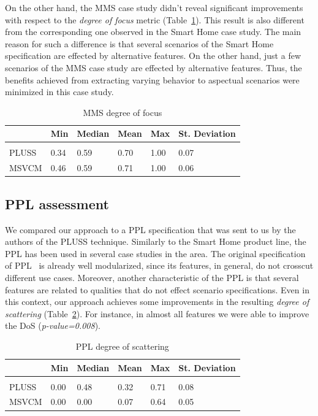 On the other hand, the MMS case study didn't reveal significant improvements with
respect to the \emph{degree of focus} metric (Table~\ref{tab:mms-dof}). This
result is also different from the corresponding one observed in the Smart Home
case study. The main reason for such a difference is that several scenarios of
the Smart Home specification are effected by alternative features. On the other
hand, just a few scenarios of the MMS case study are effected by alternative
features. Thus, the benefits achieved from extracting varying behavior to
aspectual scenarios were minimized in this case study.

\begin{table}[htb] \centering
\caption{MMS degree of focus}
\label{tab:mms-dof}
\begin{small}
\begin{tabular}{llllll} \hline
					& Min 	& Median 	& Mean 	& Max 	& St. Deviation \\ \hline \\
	PLUSS			& 0.34	& 0.59		& 0.70	& 1.00	& 0.07			\\
	MSVCM			& 0.46  & 0.59   	& 0.71 	& 1.00 	& 0.06			\\ \hline	
\end{tabular}
\end{small}
\end{table}

\subsection{PPL assessment}

We compared our approach to a PPL specification that was sent to us by the
authors of the PLUSS technique. Similarly to the Smart Home product line, the PPL has been used in several case
studies in the area. The original specification of PPL~\cite{PPL:2008} is already well
modularized, since its features, in general, do not crosscut different
use cases. Moreover, another characteristic of the PPL is that several features
are related to qualities that do not effect scenario specifications.
Even in this context, our approach achieves some improvements in the
resulting \emph{degree of scattering} (Table~\ref{tab:ppl-dos}). For instance,
in almost all features we were able to improve the DoS (\emph{p-value=0.008}).


\begin{table}[htb] \centering
\caption{PPL degree of scattering}
\label{tab:ppl-dos}
\begin{small}
\begin{tabular}{llllll} \hline
					& Min 	& Median 	& Mean 	& Max 	& St. Deviation \\ \hline \\
	PLUSS			& 0.00	& 0.48		& 0.32	& 0.71	& 0.08			\\
	MSVCM			& 0.00  & 0.00   	& 0.07 	& 0.64 	& 0.05			\\ \hline	
\end{tabular}
\end{small}
\end{table}


